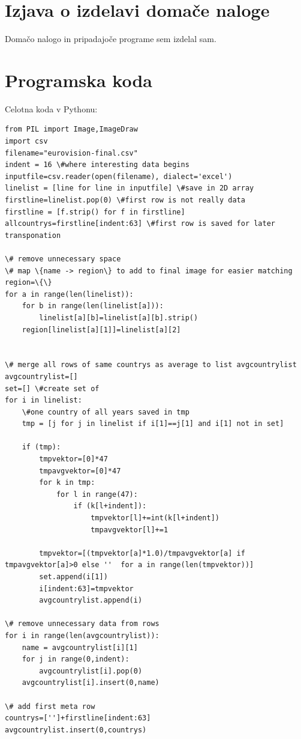 \documentclass[a4paper,11pt]{article}
\begin{document}
\section{Izjava o izdelavi domače naloge}

Domačo nalogo in pripadajoče programe sem izdelal sam.

\appendix
\appendixpage

\section{\label{app-code}Programska koda}

Celotna koda v Pythonu:

\begin{lstlisting}
from PIL import Image,ImageDraw
import csv
filename="eurovision-final.csv"
indent = 16 \#where interesting data begins
inputfile=csv.reader(open(filename), dialect='excel')
linelist = [line for line in inputfile] \#save in 2D array
firstline=linelist.pop(0) \#first row is not really data
firstline = [f.strip() for f in firstline]
allcountrys=firstline[indent:63] \#first row is saved for later transponation

\# remove unnecessary space
\# map \{name -> region\} to add to final image for easier matching
region=\{\}
for a in range(len(linelist)):
    for b in range(len(linelist[a])):
        linelist[a][b]=linelist[a][b].strip()
    region[linelist[a][1]]=linelist[a][2]


\# merge all rows of same countrys as average to list avgcountrylist
avgcountrylist=[]
set=[] \#create set of
for i in linelist:
    \#one country of all years saved in tmp
    tmp = [j for j in linelist if i[1]==j[1] and i[1] not in set]

    if (tmp):
        tmpvektor=[0]*47
        tmpavgvektor=[0]*47
        for k in tmp:
            for l in range(47):
                if (k[l+indent]):
                    tmpvektor[l]+=int(k[l+indent])
                    tmpavgvektor[l]+=1

        tmpvektor=[(tmpvektor[a]*1.0)/tmpavgvektor[a] if tmpavgvektor[a]>0 else ''  for a in range(len(tmpvektor))]
        set.append(i[1])
        i[indent:63]=tmpvektor
        avgcountrylist.append(i)

\# remove unnecessary data from rows
for i in range(len(avgcountrylist)):
    name = avgcountrylist[i][1]
    for j in range(0,indent):
        avgcountrylist[i].pop(0)
    avgcountrylist[i].insert(0,name)

\# add first meta row
countrys=['']+firstline[indent:63]
avgcountrylist.insert(0,countrys)


\end{lstlisting}
\end{document}
